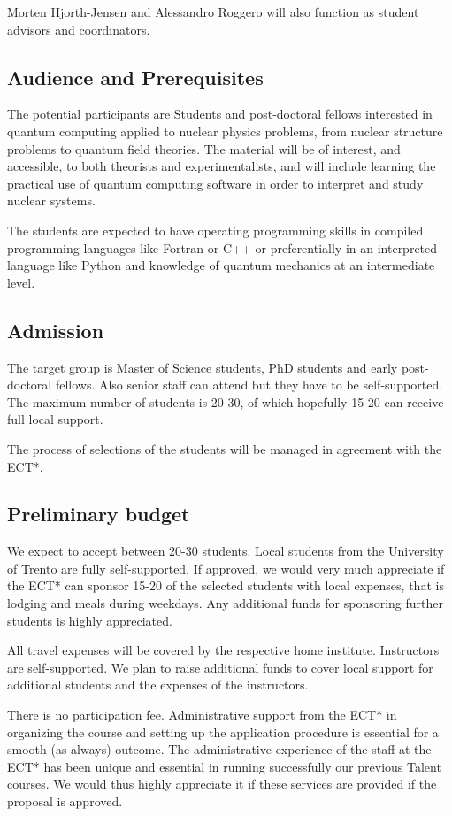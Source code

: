 \documentclass[superscriptaddress,amsmath,amssymb,aps,floatfix]{revtex4-2}
\begin{document}
Morten Hjorth-Jensen and Alessandro Roggero will also function as student
advisors and coordinators.

\subsection{Audience and Prerequisites}
The potential participants are
Students and post-doctoral fellows interested in quantum computing
applied to nuclear physics problems, from nuclear structure problems to quantum
field theories. The material will be of interest, and accessible, to
both theorists and experimentalists, and will include learning the
practical use of quantum computing software in order to interpret and
study nuclear systems.

The students are expected to have operating programming skills in
compiled programming languages like Fortran or C++ or preferentially in
an interpreted language like Python and knowledge of quantum mechanics
at an intermediate level.

\subsection{Admission}

The target group is Master of Science students, PhD students and early
post-doctoral fellows. Also senior staff can attend but they have to be
self-supported. The maximum number of students is 20-30, of which
hopefully 15-20 can receive full local support.

The process of selections of the students will be managed in agreement
with the ECT*.

\subsection{Preliminary budget}

We expect to accept between 20-30 students. Local students from the
University of Trento are fully self-supported. If approved, we would
very much appreciate if the ECT* can sponsor 15-20 of the selected
students with local expenses, that is lodging and meals during weekdays.
Any additional funds for sponsoring further students is highly
appreciated.

All travel expenses will be covered by the respective home institute.
Instructors are self-supported. We plan to raise additional funds to
cover local support for additional students and the expenses of the
instructors.

There is no participation fee. Administrative support from the ECT* in
organizing the course and setting up the application procedure is
essential for a smooth (as always) outcome. The administrative
experience of the staff at the ECT* has been unique and essential in
running successfully our previous Talent courses. We would thus highly
appreciate it if these services are provided if the proposal is
approved.
\end{document}
